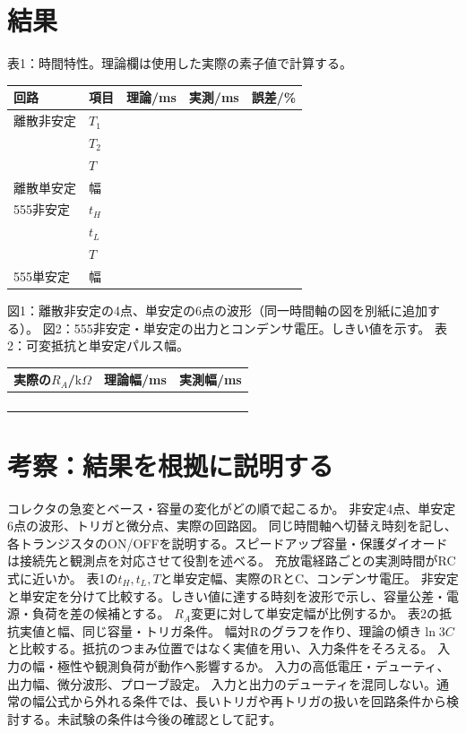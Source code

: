 \documentclass[lualatex,a4paper,10pt]{jlreq}
\begin{document}
\section{結果}\label{sec:auto5}
表1：時間特性。理論欄は使用した実際の素子値で計算する。
\par\noindent\begin{tabularx}{\linewidth}{YYYYY}
\toprule 回路 & 項目 & 理論/ms & 実測/ms & 誤差/\%\\\midrule
離散非安定 &$T_1$&&&\\ &$T_2$&&&\\ &$T$&&&\\
離散単安定 &幅&&&\\555非安定 &$t_H$&&&\\ &$t_L$&&&\\ &$T$&&&\\
555単安定 &幅&&&\\\bottomrule
\end{tabularx}
図1：離散非安定の4点、単安定の6点の波形（同一時間軸の図を別紙に追加する）。
\writing{40mm}
図2：555非安定・単安定の出力とコンデンサ電圧。しきい値を示す。
\writing{35mm}
\clearpage
表2：可変抵抗と単安定パルス幅。
\par\noindent\begin{tabularx}{\linewidth}{YYY}
\toprule 実際の$R_A$/$\mathrm{k}\Omega$ & 理論幅/ms & 実測幅/ms\\\midrule
&&\\&&\\&&\\&&\\\bottomrule
\end{tabularx}
\clearpage\section{考察：結果を根拠に説明する}\label{sec:auto6}
{コレクタの急変とベース・容量の変化がどの順で起こるか。}
{非安定4点、単安定6点の波形、トリガと微分点、実際の回路図。}
{同じ時間軸へ切替え時刻を記し、各トランジスタのON/OFFを説明する。スピードアップ容量・保護ダイオードは接続先と観測点を対応させて役割を述べる。}
{充放電経路ごとの実測時間がRC式に近いか。}
{表1の$t_H,t_L,T$と単安定幅、実際のRとC、コンデンサ電圧。}
{非安定と単安定を分けて比較する。しきい値に達する時刻を波形で示し、容量公差・電源・負荷を差の候補とする。}
{$R_A$変更に対して単安定幅が比例するか。}
{表2の抵抗実値と幅、同じ容量・トリガ条件。}
{幅対Rのグラフを作り、理論の傾き$\ln3C$と比較する。抵抗のつまみ位置ではなく実値を用い、入力条件をそろえる。}
{入力の幅・極性や観測負荷が動作へ影響するか。}
{入力の高低電圧・デューティ、出力幅、微分波形、プローブ設定。}
{入力と出力のデューティを混同しない。通常の幅公式から外れる条件では、長いトリガや再トリガの扱いを回路条件から検討する。未試験の条件は今後の確認として記す。}
\end{document}

